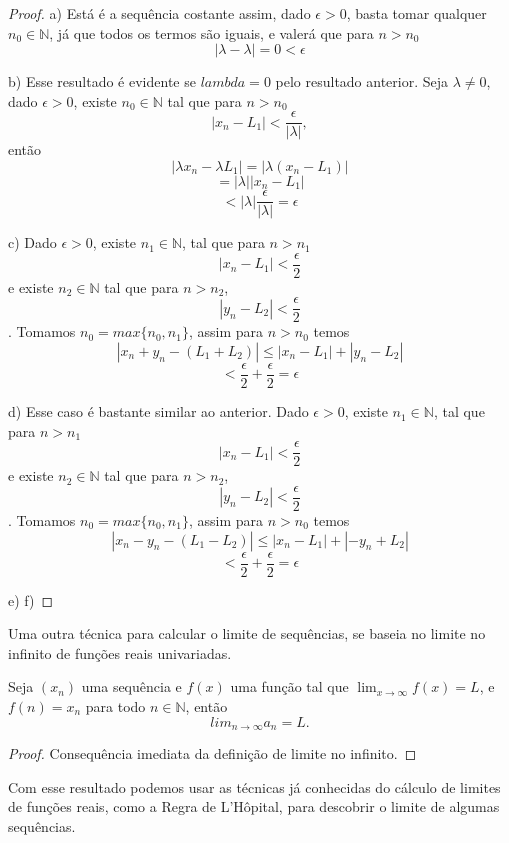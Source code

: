 \begin{proof}
    a) Está é a sequência costante assim, dado $\epsilon > 0$, basta tomar 
    qualquer $n_0 \in \mathbb{N}$, já que todos os termos são iguais, e valerá 
    que para $n>n_0$
    $$|\lambda - \lambda| = 0 < \epsilon$$
    
    b) Esse resultado é evidente se $lambda = 0$ pelo resultado anterior.
    Seja $\lambda \neq 0$, dado $\epsilon > 0$, existe $n_0 \in \mathbb{N}$ tal 
    que para $n>n_0$
    $$|x_n - L_1| < \frac{\epsilon}{|\lambda|},$$
    então
    $$|\lambda x_n - \lambda L_1| = |\lambda(x_n - L_1)|$$
    $$ = |\lambda| |x_n - L_1|$$
    $$ < |\lambda| \frac{\epsilon}{|\lambda|} = \epsilon$$ 

    c) Dado $\epsilon > 0$, existe $n_1 \in \mathbb{N}$, tal que para $n>n_1$
    $$|x_n - L_1| < \frac{\epsilon}{2}$$
    e existe $n_2 \in \mathbb{N}$ tal que para $n>n_2$,
    $$|y_n - L_2| < \frac{\epsilon}{2} $$.
    Tomamos $n_0 = max\{n_0,n_1 \}$, assim para $n > n_0$ temos
    $$|x_n + y_n -(L_1 + L_2)| \leq |x_n - L_1| + |y_n - L_2|$$
    $$ < \frac{\epsilon}{2} + \frac{\epsilon}{2} = \epsilon$$
    
    d) Esse caso é bastante similar ao anterior.
    Dado $\epsilon > 0$, existe $n_1 \in \mathbb{N}$, tal que para $n>n_1$
    $$|x_n - L_1| < \frac{\epsilon}{2}$$
    e existe $n_2 \in \mathbb{N}$ tal que para $n>n_2$,
    $$|y_n - L_2| < \frac{\epsilon}{2} $$.
    Tomamos $n_0 = max\{n_0,n_1 \}$, assim para $n > n_0$ temos
    $$|x_n - y_n -(L_1 - L_2)| \leq |x_n - L_1| + |-y_n + L_2|$$
    $$ < \frac{\epsilon}{2} + \frac{\epsilon}{2} = \epsilon$$

    e)
    f)
\end{proof}

Uma outra técnica para calcular o limite de sequências, se baseia no limite no 
infinito de funções reais univariadas.

\begin{teo}
    Seja $(x_n)$ uma sequência e $f(x)$ uma função tal que $\lim_{x \to \infty} 
    f(x) = L$, e $f(n) = x_n$ para todo $n \in \mathbb{N}$, então
    $$lim_{n \to \infty} a_n = L.$$ 
\end{teo}

\begin{proof}
    Consequência imediata da definição de limite no infinito.
\end{proof}

Com esse resultado podemos usar as técnicas já conhecidas do cálculo de limites
de funções reais, como a Regra de L'Hôpital, para descobrir o limite de algumas
sequências.

